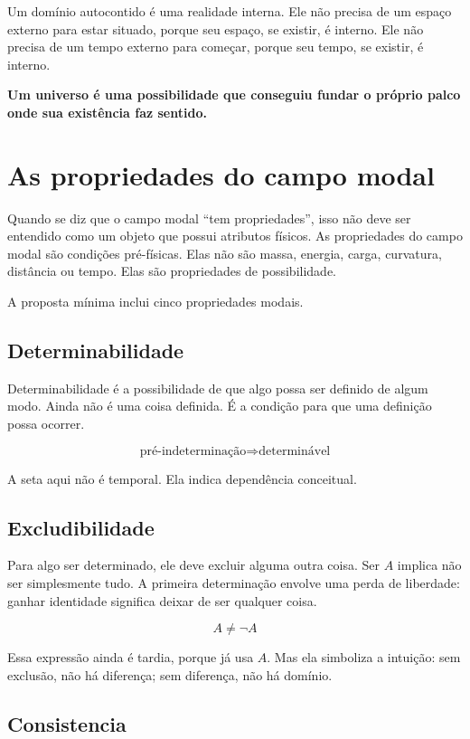 \documentclass[11pt,a4paper]{article}
\newcommand{\depends}{\Rightarrow}
\newenvironment{corebox}{\begin{framed}\small\bfseries}{\end{framed}}
\begin{document}
Um domínio autocontido é uma realidade interna. Ele não precisa de um espaço externo para estar situado, porque seu espaço, se existir, é interno. Ele não precisa de um tempo externo para começar, porque seu tempo, se existir, é interno.

\begin{corebox}
Um universo é uma possibilidade que conseguiu fundar o próprio palco onde sua existência faz sentido.
\end{corebox}

\section{As propriedades do campo modal}

Quando se diz que o campo modal ``tem propriedades'', isso não deve ser entendido como um objeto que possui atributos físicos. As propriedades do campo modal são condições pré-físicas. Elas não são massa, energia, carga, curvatura, distância ou tempo. Elas são propriedades de possibilidade.

A proposta mínima inclui cinco propriedades modais.

\subsection{Determinabilidade}

Determinabilidade é a possibilidade de que algo possa ser definido de algum modo. Ainda não é uma coisa definida. É a condição para que uma definição possa ocorrer.

\[
\text{pré-indeterminação} \depends \text{determinável}
\]

A seta aqui não é temporal. Ela indica dependência conceitual.

\subsection{Excludibilidade}

Para algo ser determinado, ele deve excluir alguma outra coisa. Ser \(A\) implica não ser simplesmente tudo. A primeira determinação envolve uma perda de liberdade: ganhar identidade significa deixar de ser qualquer coisa.

\[
A \neq \neg A
\]

Essa expressão ainda é tardia, porque já usa \(A\). Mas ela simboliza a intuição: sem exclusão, não há diferença; sem diferença, não há domínio.

\subsection{Consistencia}
\end{document}
